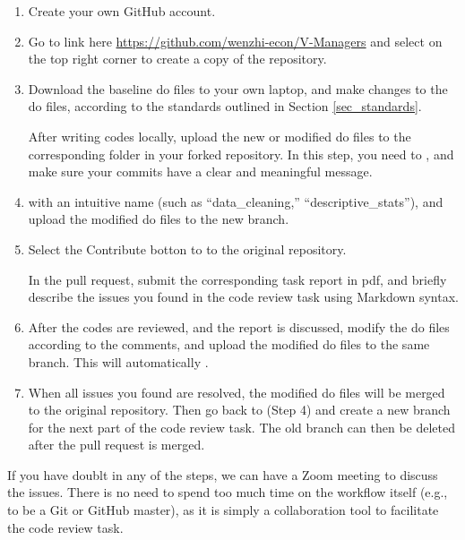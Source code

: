 \documentclass[12pt]{article}
\newcommand{\highlightPP}[1]{{{\color{MyPurple}{#1}}}}
\theoremstyle{definition}
\begin{document}
\begin{enumerate}[topsep=0pt, leftmargin=20pt, itemsep=0pt, label=(Step \arabic*)]
	\setlength{\parskip}{10pt} 
	\item Create your own GitHub account.
	
	\item Go to link here \href{https://github.com/wenzhi-econ/V-Managers}{https://github.com/wenzhi-econ/V-Managers} and select \highlightPP{Fork} on the top right corner to create a copy of the repository.
	
	\item Download the baseline do files to your own laptop, and make changes to the do files, according to the standards outlined in Section \ref{sec_standards}.
	
    After writing codes locally, upload the new or modified do files to the corresponding folder in your forked repository. In this step, you need to \highlightPP{commit changes}, and make sure your commits have a clear and meaningful message.
	
	\item \highlightPP{Create a new branch} with an intuitive name (such as ``data\_cleaning,'' ``descriptive\_stats''), and upload the modified do files to the new branch.
	
	\item Select the Contribute botton to \highlightPP{start a pull request} to the original repository. 
    
    In the pull request, submit the corresponding task report in pdf, and briefly describe the issues you found in the code review task using Markdown syntax.
	\item After the codes are reviewed, and the report is discussed, modify the do files according to the comments, and upload the modified do files to the same branch. This will automatically \highlightPP{update the pull request}.
	
	\item When all issues you found are resolved, the modified do files will be merged to the original repository. Then go back to (Step 4) and create a new branch for the next part of the code review task. {The old branch can then be deleted after the pull request is merged.}
\end{enumerate}

If you have doublt in any of the steps, we can have a Zoom meeting to discuss the issues. There is no need to spend too much time on the workflow itself (e.g., to be a Git or GitHub master), as it is simply a collaboration tool to facilitate the code review task. 
\end{document}
